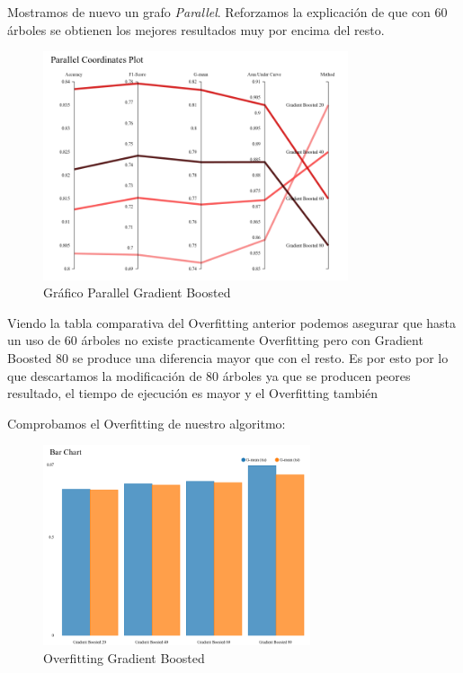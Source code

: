	\newpage 
	Mostramos de nuevo un grafo \textit{Parallel}. Reforzamos la explicación de que con 60 árboles se obtienen los mejores resultados muy por encima del resto.


	\begin{figure}[H]
		\centering
		\includegraphics[width=0.8\textwidth]{img/plotgb.png}
		\caption{Gráfico Parallel Gradient Boosted}
	\end{figure}

	Viendo la tabla comparativa del Overfitting anterior podemos asegurar que hasta un uso de 60 árboles no existe practicamente Overfitting pero con Gradient Boosted 80 se produce una diferencia mayor que con el resto. Es por esto por lo que descartamos la modificación de 80 árboles ya que se producen peores resultado, el tiempo de ejecución es mayor y el Overfitting también


	Comprobamos el Overfitting de nuestro algoritmo:
	
	\begin{figure}[H]
		\centering
		\includegraphics[width=0.7\textwidth]{img/sobregb.png}
		\caption{Overfitting Gradient Boosted}
	\end{figure}

